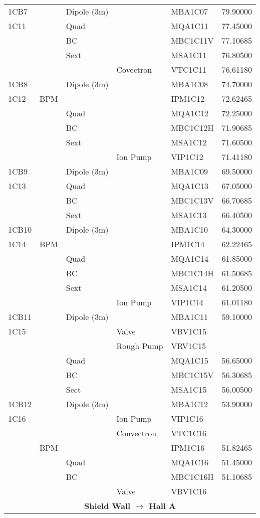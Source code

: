 {\begin{longtable}[hpt]{lllllr}
1CB7 && Dipole (3m) && MBA1C07 & 79.90000 \\
1C11 && Quad && MQA1C11 & 77.45000 \\
&& BC && MBC1C11V & 77.10685 \\
&& Sext && MSA1C11 & 76.80500 \\
&&& Covectron & VTC1C11 & 76.61180 \\
1CB8 && Dipole (3m) && MBA1C08 & 74.70000 \\
1C12 & BPM &&& IPM1C12 & 72.62465 \\
&& Quad && MQA1C12 & 72.25000 \\
&& BC && MBC1C12H & 71.90685 \\
&& Sext && MSA1C12 & 71.60500 \\
&&& Ion Pump & VIP1C12 & 71.41180 \\
1CB9 && Dipole (3m) && MBA1C09 & 69.50000 \\
1C13 && Quad && MQA1C13 & 67.05000 \\
&& BC && MBC1C13V & 66.70685 \\
&& Sext && MSA1C13 & 66.40500 \\
1CB10 && Dipole (3m) && MBA1C10 & 64.30000 \\
1C14 & BPM &&& IPM1C14 & 62.22465 \\
&& Quad && MQA1C14 & 61.85000 \\
&& BC && MBC1C14H & 61.50685 \\
&& Sext && MSA1C14 & 61.20500 \\
&&& Ion Pump & VIP1C14 & 61.01180 \\
1CB11 && Dipole (3m) && MBA1C11 & 59.10000 \\
1C15 &&& Valve & VBV1C15 & \\
&&& Rough Pump & VRV1C15 & \\
&& Quad && MQA1C15 & 56.65000 \\
&& BC && MBC1C15V & 56.30685 \\
&& Sect && MSA1C15 & 56.00500 \\
1CB12 && Dipole (3m) && MBA1C12 & 53.90000 \\ 
1C16 &&& Ion Pump & VIP1C16 & \\
&&& Convectron & VTC1C16 & \\
& BPM &&& IPM1C16 & 51.82465 \\
&& Quad && MQA1C16 & 51.45000 \\
&& BC && MBC1C16H & 51.10685 \\
&&& Valve & VBV1C16 & \\ 
\hline \multicolumn{6}{c}{{\bf Shield Wall $\rightarrow$ Hall A}} \\ \hline 

\end{longtable}}
